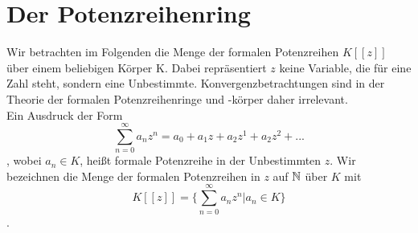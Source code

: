 \section{Der Potenzreihenring}\label{potenzreihenring}

%
Wir betrachten im Folgenden die Menge der formalen Potenzreihen $K[[z]]$ über einem beliebigen Körper K. Dabei repräsentiert $z$ keine Variable, die für eine Zahl steht, sondern eine Unbestimmte. Konvergenzbetrachtungen sind in der Theorie der formalen Potenzreihenringe und -körper daher irrelevant. \\
Ein Ausdruck der Form
\begin{equation}\label{eq: formalepotenzreihe}\sum_{n=0}^\infty a_n z^n = a_0 + a_1z + a_2z^1 + a_2z^2 + ...\end{equation},
wobei $a_n \in K$, heißt formale Potenzreihe in der Unbestimmten $z$.
Wir bezeichnen die Menge der formalen Potenzreihen in $z$ auf $\mathbb{N}$ über $K$ mit \[K [[z]] = \lbrace \sum_{n=0}^\infty a_n z^n \vert a_n\in K \rbrace \]. 

